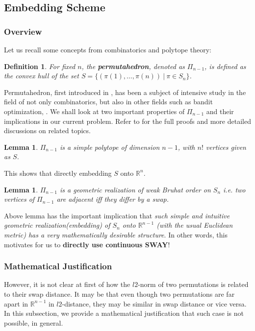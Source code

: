 \documentclass[10pt,journal,compsoc]{IEEEtran}
\newtheorem{definition}{Definition}[section]
\newtheorem{lemma}[theorem]{Lemma}
\begin{document}
	\subsection{Embedding Scheme}
	\label{sec:embedding}
	\subsubsection{Overview}
	Let us recall some concepts from combinatorics and polytope theory:
	
	\begin{definition}
		For fixed $n$, the {\bf permutahedron}, denoted as $\Pi_{n-1}$, is defined as the convex hull of the set $S = \{ (\pi(1), \dots, \pi(n)) \ | \ \pi \in S_n \}$. 
	\end{definition}
	
	Permutahedron, first introduced in \cite{permutahedron}, has been a subject of intensive study in the field of not only combinatorics, but also in other fields such as bandit optimization\cite{bandit}, .
	We shall look at two important properties of $\Pi_{n-1}$ and their implications in our current problem. Refer to \cite{polytope, combinatorics} for the full proofs and more detailed discussions on related topics.
	
	\begin{lemma}
		$\Pi_{n-1}$ is a simple polytope of dimension $n - 1$, with $n!$ vertices given as $S$.
	\end{lemma}
	
	This shows that directly embedding $S$ onto $\mathbb{R}^n$.
	
	\begin{lemma}
		$\Pi_{n-1}$ is a geometric realization of weak Bruhat order on $S_n$ i.e. two vertices of $\Pi_{n-1}$ are adjacent iff they differ by a swap.
	\end{lemma}
	
	Above lemma has the important implication that {\it such simple and intuitive geometric realization(embedding) of $S_n$ onto $\mathbb{R}^{n-1}$ (with the usual Euclidean metric) has a very mathematically desirable structure}.
	In other words, this motivates for us to {\bf directly use continuous SWAY\cite{SWAY}}!
	
	\subsubsection{Mathematical Justification}
	However, it is not clear at first of how the $l2$-norm of two permutations is related to their swap distance.
	It may be that even though two permutations are far apart in $\mathbb{R}^{n-1}$ in $l2$-distance, they may be similar in swap distance or vice versa.
	In this subsection, we provide a mathematical justification that such case is not possible, in general.
	
\end{document}
